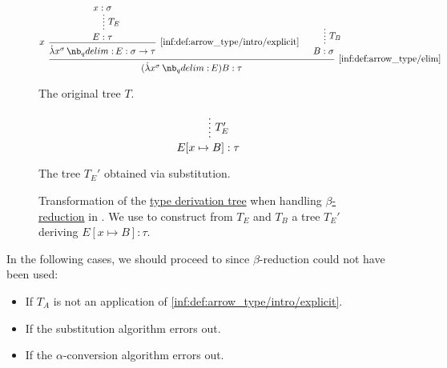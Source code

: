 \begin{algorithm}
\begin{thmenum}
\begin{thmenum}
      \begin{figure}[!ht]
        \hfill
        \hfill
        \begin{subcaptionblock}[B]{0.45\textwidth}
          \begin{equation*}
            \begin{prooftree}
              \hypo{ x: \sigma }
              \ellipsis { \( T_E \) } { E: \tau }
              \infer[left label=\( x \)]1[\ref{inf:def:arrow_type/intro/explicit}]{ \qabs {x^\sigma} E: \sigma \rightarrow \tau }.

              \hypo{ }
              \ellipsis { \( T_B \) } { B: \sigma }
              \infer2[\ref{inf:def:arrow_type/elim}]{ (\qabs {x^\sigma} E) B: \tau }.
            \end{prooftree}
          \end{equation*}
          \caption{The original tree \( T \).}
        \end{subcaptionblock}
        \hfill
        \begin{subcaptionblock}[B]{0.45\textwidth}
          \begin{equation*}
            \begin{prooftree}
              \hypo{ }
              \ellipsis { \( T_E' \) } { E[x \mapsto B]: \tau }
            \end{prooftree}
          \end{equation*}
          \caption{The tree \( T_E' \) obtained via substitution.}
        \end{subcaptionblock}
        \hfill
        \caption{Transformation of the \hyperref[def:type_derivation_tree]{type derivation tree} when handling \hyperref[def:beta_eta_reduction]{\( \beta \)-reduction} in . We use  to construct from \( T_E \) and \( T_B \) a tree \( T_E' \) deriving \( E[x \mapsto B]: \tau \).}\label{fig:alg:simply_typed_reduction/arrow_elim/beta}
      \end{figure}

      In the following cases, we should proceed to  since \( \beta \)-reduction could not have been used:
      \begin{itemize}
        \item If \( T_A \) is not an application of \ref{inf:def:arrow_type/intro/explicit}.
        \item If the substitution algorithm errors out.
        \item If the \( \alpha \)-conversion algorithm errors out.
      \end{itemize}


\end{thmenum}
\end{thmenum}
\end{algorithm}

